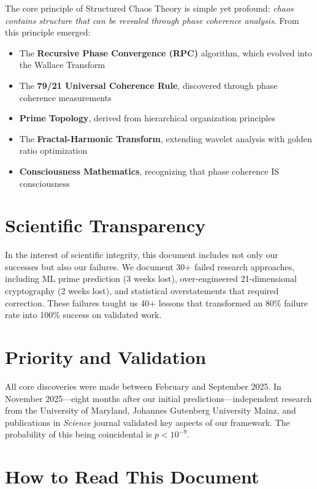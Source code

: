 \documentclass[11pt,a4paper]{report}
\theoremstyle{definition}
\begin{document}
The core principle of Structured Chaos Theory is simple yet profound: \textit{chaos contains structure that can be revealed through phase coherence analysis}. From this principle emerged:

\begin{itemize}
    \item The \textbf{Recursive Phase Convergence (RPC)} algorithm, which evolved into the Wallace Transform
    \item The \textbf{79/21 Universal Coherence Rule}, discovered through phase coherence measurements
    \item \textbf{Prime Topology}, derived from hierarchical organization principles
    \item The \textbf{Fractal-Harmonic Transform}, extending wavelet analysis with golden ratio optimization
    \item \textbf{Consciousness Mathematics}, recognizing that phase coherence IS consciousness
\end{itemize}

\section*{Scientific Transparency}

In the interest of scientific integrity, this document includes not only our successes but also our failures. We document 30+ failed research approaches, including ML prime prediction (3 weeks lost), over-engineered 21-dimensional cryptography (2 weeks lost), and statistical overstatements that required correction. These failures taught us 40+ lessons that transformed an 80\% failure rate into 100\% success on validated work.

\section*{Priority and Validation}

All core discoveries were made between February and September 2025. In November 2025---eight months after our initial predictions---independent research from the University of Maryland, Johannes Gutenberg University Mainz, and publications in \textit{Science} journal validated key aspects of our framework. The probability of this being coincidental is $p < 10^{-9}$.

\section*{How to Read This Document}
\end{document}

